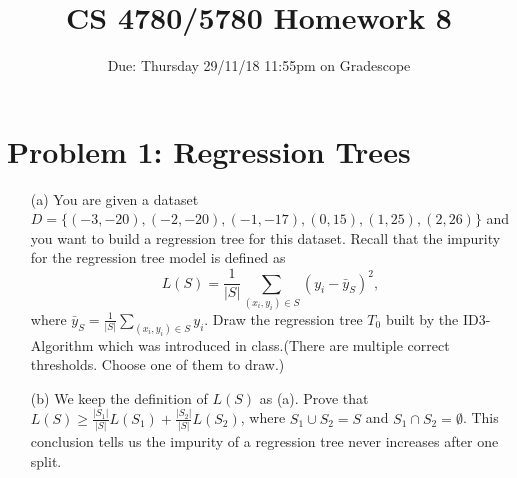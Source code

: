 \documentclass{article}
\title{CS 4780/5780 Homework 8\vspace{-10pt}}
\author{Due: Thursday 29/11/18 11:55pm on Gradescope}
\date{}
\begin{document}
    \maketitle
	\section*{Problem 1:  Regression Trees}
	\begin{enumerate}
	\item[(a)] You are given a dataset $D=\{(-3, -20), (-2, -20), (-1, -17), (0, 15), (1, 25), (2, 26)\}$ and you want to build a regression tree for this dataset. Recall that the impurity for the regression tree model is  defined as
	$$
	L(S) = \frac{1}{|S|}\sum_{(x_i, y_i)\in S}(y_i - \bar{y}_S)^2,
	$$
	where $\bar{y}_S = \frac{1}{|S|}\sum_{(x_i, y_i)\in S}y_i$. Draw the regression tree $T_0$ built by the ID3-Algorithm which was introduced in class.(There are multiple correct thresholds. Choose one of them to draw.)
	
	\item[(b)] We keep the definition of $L(S)$ as (a). Prove that $L(S) \geq \frac{|S_1|}{|S|}L(S_1) + \frac{|S_2|}{|S|}L(S_2)$, where $S_1 \cup S_2 = S$ and $S_1\cap S_2 = \emptyset$. This conclusion tells us the impurity of a regression tree never increases after one split.
	

\end{enumerate}
\end{document}
